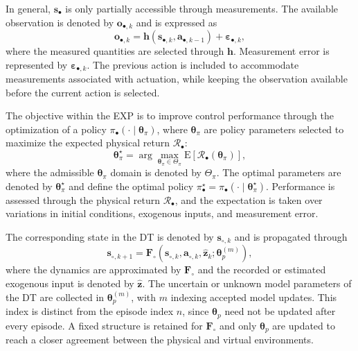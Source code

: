 \documentclass[journal]{IEEEtran}
\begin{document}
In general, $\mathbf s_{\bullet}$ is only partially accessible through measurements. The available observation is denoted by $\mathbf o_{\bullet,k}$ and is expressed as
\begin{equation}
 \mathbf o_{\bullet,k}
 =\mathbf h(\mathbf s_{\bullet,k},\mathbf a_{\bullet,k-1})
 +\boldsymbol{\varepsilon}_{\bullet,k},
 \label{eq:rt-physical-observation}
\end{equation}
where the measured quantities are selected through $\mathbf h$. Measurement error is represented by $\boldsymbol{\varepsilon}_{\bullet,k}$. The previous action is included to accommodate measurements associated with actuation, while keeping the observation available before the current action is selected.

The objective within the EXP is to improve control performance through the optimization of a policy $\pi_\bullet(\cdot\mid\boldsymbol{\theta}_\pi)$, where $\boldsymbol{\theta}_\pi$ are policy parameters selected to maximize the expected physical return $\mathcal R_\bullet$:
\begin{equation}
 \boldsymbol{\theta}_\pi^\star
 =\arg\max_{\boldsymbol{\theta}_\pi\in\Theta_\pi}
 \mathrm E[\mathcal R_\bullet(\boldsymbol{\theta}_\pi)],
 \label{eq:rt-physical-objective}
\end{equation}
where the admissible $\boldsymbol{\theta}_\pi$ domain is denoted by $\Theta_\pi$. The optimal parameters are denoted by $\boldsymbol{\theta}_\pi^\star$ and define the optimal policy $\pi_\bullet^\star=\pi_\bullet(\cdot\mid\boldsymbol{\theta}_\pi^\star)$. Performance is assessed through the physical return $\mathcal R_\bullet$, and the expectation is taken over variations in initial conditions, exogenous inputs, and measurement error.

The corresponding state in the DT is denoted by $\mathbf s_{\circ,k}$ and is propagated through
\begin{equation}
 \mathbf s_{\circ,k+1}
 =\mathbf F_\circ(\mathbf s_{\circ,k},\mathbf a_{\circ,k},
                 \widehat{\mathbf z}_k;\boldsymbol{\theta}_p^{(m)}),
 \label{eq:rt-digital-state}
\end{equation}
where the dynamics are approximated by $\mathbf F_\circ$ and the recorded or estimated exogenous input is denoted by $\widehat{\mathbf z}$. The uncertain or unknown model parameters of the DT are collected in $\boldsymbol{\theta}_p^{(m)}$, with $m$ indexing accepted model updates. This index is distinct from the episode index $n$, since $\boldsymbol{\theta}_p$ need not be updated after every episode. A fixed structure is retained for $\mathbf F_\circ$ and only $\boldsymbol{\theta}_p$ are updated to reach a closer agreement between the physical and virtual environments.
\end{document}
